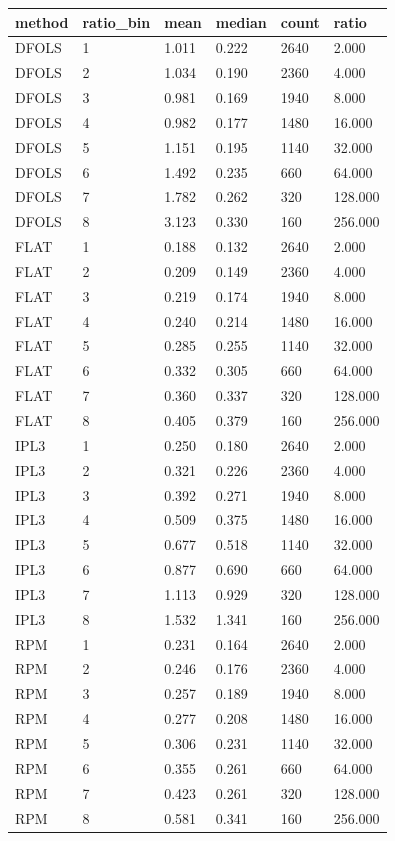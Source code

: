 \begin{tabular}{llllll}
\hline
method & ratio\_bin & mean & median & count & ratio \\
\hline
DFOLS & 1 & 1.011 & 0.222 & 2640 & 2.000 \\
DFOLS & 2 & 1.034 & 0.190 & 2360 & 4.000 \\
DFOLS & 3 & 0.981 & 0.169 & 1940 & 8.000 \\
DFOLS & 4 & 0.982 & 0.177 & 1480 & 16.000 \\
DFOLS & 5 & 1.151 & 0.195 & 1140 & 32.000 \\
DFOLS & 6 & 1.492 & 0.235 & 660 & 64.000 \\
DFOLS & 7 & 1.782 & 0.262 & 320 & 128.000 \\
DFOLS & 8 & 3.123 & 0.330 & 160 & 256.000 \\
FLAT & 1 & 0.188 & 0.132 & 2640 & 2.000 \\
FLAT & 2 & 0.209 & 0.149 & 2360 & 4.000 \\
FLAT & 3 & 0.219 & 0.174 & 1940 & 8.000 \\
FLAT & 4 & 0.240 & 0.214 & 1480 & 16.000 \\
FLAT & 5 & 0.285 & 0.255 & 1140 & 32.000 \\
FLAT & 6 & 0.332 & 0.305 & 660 & 64.000 \\
FLAT & 7 & 0.360 & 0.337 & 320 & 128.000 \\
FLAT & 8 & 0.405 & 0.379 & 160 & 256.000 \\
IPL3 & 1 & 0.250 & 0.180 & 2640 & 2.000 \\
IPL3 & 2 & 0.321 & 0.226 & 2360 & 4.000 \\
IPL3 & 3 & 0.392 & 0.271 & 1940 & 8.000 \\
IPL3 & 4 & 0.509 & 0.375 & 1480 & 16.000 \\
IPL3 & 5 & 0.677 & 0.518 & 1140 & 32.000 \\
IPL3 & 6 & 0.877 & 0.690 & 660 & 64.000 \\
IPL3 & 7 & 1.113 & 0.929 & 320 & 128.000 \\
IPL3 & 8 & 1.532 & 1.341 & 160 & 256.000 \\
RPM & 1 & 0.231 & 0.164 & 2640 & 2.000 \\
RPM & 2 & 0.246 & 0.176 & 2360 & 4.000 \\
RPM & 3 & 0.257 & 0.189 & 1940 & 8.000 \\
RPM & 4 & 0.277 & 0.208 & 1480 & 16.000 \\
RPM & 5 & 0.306 & 0.231 & 1140 & 32.000 \\
RPM & 6 & 0.355 & 0.261 & 660 & 64.000 \\
RPM & 7 & 0.423 & 0.261 & 320 & 128.000 \\
RPM & 8 & 0.581 & 0.341 & 160 & 256.000 \\
\hline
\end{tabular}
